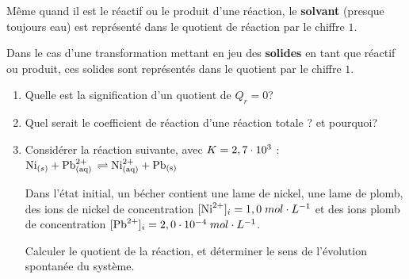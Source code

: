 \documentclass[11pt,a4paper]{article}
\begin{document}
\begin{rmrq}
Même quand il est le réactif ou le produit d’une réaction, le \textbf{solvant} (presque toujours eau) est représenté dans le quotient de réaction par le chiffre $1$.

Dans le cas d’une transformation mettant en jeu des \textbf{solides} en tant que réactif ou produit, ces solides sont représentés dans le quotient par le chiffre $1$.
\end{rmrq}

\begin{exo}
\begin{enumerate}
    \item Quelle est la signification d'un quotient de $Q_r = 0$? 
    \vspace{.5cm}
    \item Quel serait le coefficient de réaction d’une réaction totale ? et pourquoi?
    \vspace{.5cm}
    \item Considérer la réaction suivante, avec $K = 2,7\cdot10^{3}$ : $\ce{Ni}_{(s)} + \ce{Pb^2+_{(aq)} \rightleftharpoons \ce{Ni^2+_{(aq)}} + \ce{Pb_{(s)}}}$
    
    Dans l'état initial, un bécher contient une lame de nickel, une lame de plomb, des ions de nickel de concentration $[\ce{Ni^2+}]_i=1,0 \mpl$ et des ions plomb de concentration $[\ce{Pb^2+}]_i=2,0\es{-4}\mpl$. 
    
    Calculer le quotient de la réaction, et déterminer le sens de l'évolution spontanée du système. 
    \vspace{2cm}
\end{enumerate} 
\end{exo}	 
 
\end{document}
